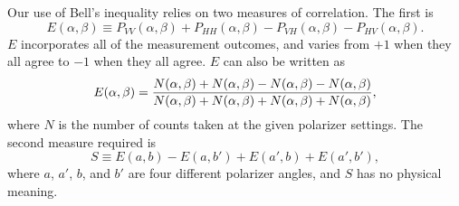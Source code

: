 \documentclass[11pt,letterpaper]{article}
\begin{document}
Our use of Bell's inequality relies on two measures of correlation. The first is
\begin{equation}
    E(\alpha, \beta) \equiv P_{VV}(\alpha, \beta) + P_{HH}(\alpha, \beta) - P_{VH}(\alpha, \beta) -P_{HV}(\alpha, \beta) . \label{E eq}
\end{equation}
$E$ incorporates all of the measurement outcomes, and varies from $+1$ when they all agree to $-1$ when they all agree. $E$ can also be written as
\begin{equation}
    E(\alpha, \beta) = {N(\alpha, \beta) + N(\alpha, \beta) - N(\alpha, \beta) - N(\alpha, \beta) \over N(\alpha, \beta) + N(\alpha, \beta) + N(\alpha, \beta) + N(\alpha, \beta) }, \label{E with counts}
\end{equation}
where $N$ is the number of counts taken at the given polarizer settings. The second measure required is
\begin{equation}
    S \equiv E(a, b) - E(a, b') + E(a', b) + E(a', b') , \label{S eq}
\end{equation}
where $a$, $a'$, $b$, and $b'$ are four different polarizer angles, and $S$ has no physical meaning.
\end{document}

